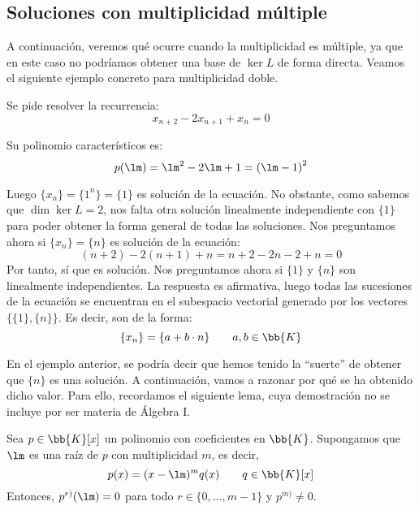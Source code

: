 \subsection{Soluciones con multiplicidad múltiple}
A continuación, veremos qué ocurre cuando la multiplicidad es múltiple, ya que en este caso no podríamos obtener una base de $\ker L$ de forma directa. Veamos el siguiente ejemplo concreto para multiplicidad doble.
\begin{ejemplo}
    Se pide resolver la recurrencia:
    \begin{equation*}
        x_{n+2} -2 x_{n+1} + x_n = 0
    \end{equation*}

    Su polinomio característicos es:
    \begin{equation*}
        p(\lm) = \lm^2 -2\lm + 1 = {(\lm-1)}^2
    \end{equation*}
    
    Luego $\{x_n\} = \{1^n\} = \{1\}$ es solución de la ecuación. No obstante, como sabemos que $\dim \ker L=2$, nos falta otra solución linealmente independiente con $\{1\}$ para poder obtener la forma general de todas las soluciones. Nos preguntamos ahora si $\{x_n\} = \{n\}$ es solución de la ecuación:
    \begin{equation*}
        (n+2) - 2(n+1) + n = n+2-2n-2+n = 0
    \end{equation*}
    Por tanto, sí que es solución. Nos preguntamos ahora si $\{1\}$ y $\{n\}$ son linealmente independientes. La respuesta es afirmativa, luego todas las sucesiones de la ecuación se encuentran en el subespacio vectorial generado por los vectores $\{\{1\}, \{n\}\}$. Es decir, son de la forma:
    \begin{equation*}
        \{x_n\} = \{a + b\cdot n\}\qquad a,b \in \bb{K}
    \end{equation*}
\end{ejemplo}

En el ejemplo anterior, se podría decir que hemos tenido la ``suerte'' de obtener que $\{n\}$ es una solución. A continuación, vamos a razonar por qué se ha obtenido dicho valor. Para ello, recordamos el siguiente lema, cuya demostración no se incluye por ser materia de Álgebra I.
\begin{lema}
    Sea $p\in \bb{K}[x]$ un polinomio con coeficientes en $\bb{K}$. Supongamos que $\lm$ es una raíz de $p$ con multiplicidad $m$, es decir,
    \begin{equation*}
        p(x)=(x-\lm)^m q(x)     \qquad q\in \bb{K}[x]
    \end{equation*}
    Entonces, $p^{r)}(\lm)=0$ para todo $r\in \{0,\dots,m-1\}$ y $p^{m)}\neq 0$.
\end{lema}

